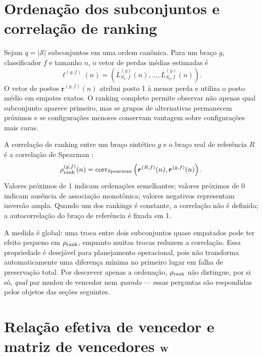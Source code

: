 \section{Ordenação dos subconjuntos e correlação de ranking}
\label{sec:ranking}

Sejam $q=|\mathcal{S}|$ subconjuntos em uma ordem canônica. Para um braço $g$, classificador $f$ e tamanho $n$, o vetor de perdas médias estimadas é
\begin{equation}
  \bm\ell^{(g,f)}(n)=
  \left(
    \overline{L}^{(g)}_{S_1,f}(n),\ldots,
    \overline{L}^{(g)}_{S_q,f}(n)
  \right).
\end{equation}
O vetor de postos $\bm r^{(g,f)}(n)$ atribui posto 1 à menor perda e utiliza o posto médio em empates exatos. O ranking completo permite observar não apenas qual subconjunto aparece primeiro, mas se grupos de alternativas permanecem próximos e se configurações menores conservam vantagem sobre configurações mais caras.

A correlação de ranking entre um braço sintético $g$ e o braço real de referência $R$ é a correlação de Spearman \cite{spearman1904}:
\begin{equation}
  \rho_{\mathrm{rank}}^{(g,f)}(n)
  =\operatorname{corr}_{\mathrm{Spearman}}
  \left(\bm r^{(R,f)}(n),\bm r^{(g,f)}(n)\right).
  \label{eq:rank-rho}
\end{equation}
Valores próximos de 1 indicam ordenações semelhantes; valores próximos de 0 indicam ausência de associação monotônica; valores negativos representam inversão ampla. Quando um dos rankings é constante, a correlação não é definida; a autocorrelação do braço de referência é fixada em 1.

A medida é global: uma troca entre dois subconjuntos quase empatados pode ter efeito pequeno em $\rho_{\mathrm{rank}}$, enquanto muitas trocas reduzem a correlação. Essa propriedade é desejável para planejamento operacional, pois não transforma automaticamente uma diferença mínima no primeiro lugar em falha de preservação total. Por descrever apenas a ordenação, $\rho_{\mathrm{rank}}$ não distingue, por si só, \emph{qual} par mudou de vencedor nem \emph{quando} --- essas perguntas são respondidas pelos objetos das seções seguintes.

\section{Relação efetiva de vencedor e matriz de vencedores \texorpdfstring{$\mathbf{W}$}{W}}
\label{sec:winner-relation}

